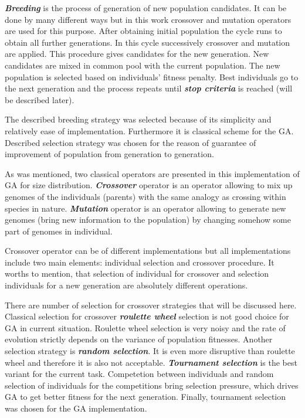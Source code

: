 \documentclass[12pt]{report}
\begin{document}
\textit{\textbf{Breeding}} is the process of generation of new population candidates. It can be done by many different ways but in this work crossover and mutation operators are used for this purpose. After obtaining initial population the cycle runs to obtain all further generations. In this cycle successively crossover and mutation are applied. This procedure gives candidates for the new generation. New candidates are mixed in common pool with the current population. The new population is selected based on individuals' fitness penalty. Best individuals go to the next generation and the process repeats until \textit{\textbf{stop criteria}} is reached (will be described later).

The described breeding strategy was selected because of its simplicity and relatively ease of implementation. Furthermore it is classical scheme for the GA. Described selection strategy was chosen for the reason of guarantee of improvement of population from generation to generation.

As was mentioned, two classical operators are presented in this implementation of GA for size distribution. \textit{\textbf{Crossover}} operator is an operator allowing to mix up genomes of the individuals (parents) with the same analogy as crossing within species in nature. \textit{\textbf{Mutation}} operator is an operator allowing to generate new genomes (bring new information to the population) by changing somehow some part of genomes in individual.

Crossover operator can be of different implementations but all implementations include two main elements: individual selection and crossover procedure. It worths to mention, that selection of individual for crossover and selection individuals for a new generation are absolutely different operations.

There are number of selection for crossover strategies that will be discussed here. Classical selection for crossover \textit{\textbf{roulette wheel}} selection is not good choice for GA in current situation. Roulette wheel selection is very noisy and the rate of evolution strictly depends on the variance of population fitnesses. Another selection strategy is \textit{\textbf{random selection}}. It is even more disruptive than roulette wheel and therefore it is also not acceptable. \textit{\textbf{Tournament selection}} is the best variant for the current task. Competetion between individuals and random selection of individuals for the competitions bring selection pressure, which drives GA to get better fitness for the next generation. Finally, tournament selection was chosen for the GA implementation.
\end{document}
